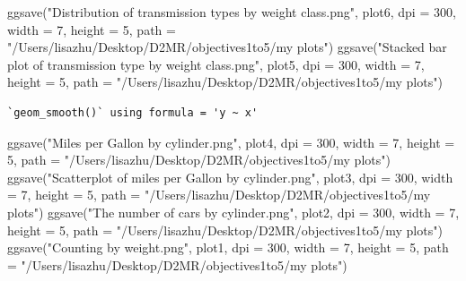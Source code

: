 \documentclass[
  man,
  floatsintext,
  longtable,
  nolmodern,
  notxfonts,
  notimes,
  colorlinks=true,linkcolor=blue,citecolor=blue,urlcolor=blue]{apa7}
\newenvironment{Shaded}{\begin{snugshade}}{\end{snugshade}}
\newcommand{\AttributeTok}[1]{\textcolor[rgb]{0.40,0.45,0.13}{#1}}
\newcommand{\DecValTok}[1]{\textcolor[rgb]{0.68,0.00,0.00}{#1}}
\newcommand{\FunctionTok}[1]{\textcolor[rgb]{0.28,0.35,0.67}{#1}}
\newcommand{\NormalTok}[1]{\textcolor[rgb]{0.00,0.23,0.31}{#1}}
\newcommand{\StringTok}[1]{\textcolor[rgb]{0.13,0.47,0.30}{#1}}
\begin{document}
\begin{Shaded}
\begin{Highlighting}[]
\FunctionTok{ggsave}\NormalTok{(}\StringTok{"Distribution of transmission types by weight class.png"}\NormalTok{, plot6, }\AttributeTok{dpi =} \DecValTok{300}\NormalTok{, }\AttributeTok{width =} \DecValTok{7}\NormalTok{, }\AttributeTok{height =} \DecValTok{5}\NormalTok{, }\AttributeTok{path =} \StringTok{"/Users/lisazhu/Desktop/D2MR/objectives1to5/my plots"}\NormalTok{)}
\FunctionTok{ggsave}\NormalTok{(}\StringTok{"Stacked bar plot of transmission type by weight class.png"}\NormalTok{, plot5, }\AttributeTok{dpi =} \DecValTok{300}\NormalTok{, }\AttributeTok{width =} \DecValTok{7}\NormalTok{, }\AttributeTok{height =} \DecValTok{5}\NormalTok{, }\AttributeTok{path =} \StringTok{"/Users/lisazhu/Desktop/D2MR/objectives1to5/my plots"}\NormalTok{)}
\end{Highlighting}
\end{Shaded}

\begin{verbatim}
`geom_smooth()` using formula = 'y ~ x'
\end{verbatim}

\begin{Shaded}
\begin{Highlighting}[]
\FunctionTok{ggsave}\NormalTok{(}\StringTok{"Miles per Gallon by cylinder.png"}\NormalTok{, plot4, }\AttributeTok{dpi =} \DecValTok{300}\NormalTok{, }\AttributeTok{width =} \DecValTok{7}\NormalTok{, }\AttributeTok{height =} \DecValTok{5}\NormalTok{, }\AttributeTok{path =} \StringTok{"/Users/lisazhu/Desktop/D2MR/objectives1to5/my plots"}\NormalTok{)}
\FunctionTok{ggsave}\NormalTok{(}\StringTok{"Scatterplot of miles per Gallon by cylinder.png"}\NormalTok{, plot3, }\AttributeTok{dpi =} \DecValTok{300}\NormalTok{, }\AttributeTok{width =} \DecValTok{7}\NormalTok{, }\AttributeTok{height =} \DecValTok{5}\NormalTok{, }\AttributeTok{path =} \StringTok{"/Users/lisazhu/Desktop/D2MR/objectives1to5/my plots"}\NormalTok{)}
\FunctionTok{ggsave}\NormalTok{(}\StringTok{"The number of cars by cylinder.png"}\NormalTok{, plot2, }\AttributeTok{dpi =} \DecValTok{300}\NormalTok{, }\AttributeTok{width =} \DecValTok{7}\NormalTok{, }\AttributeTok{height =} \DecValTok{5}\NormalTok{, }\AttributeTok{path =} \StringTok{"/Users/lisazhu/Desktop/D2MR/objectives1to5/my plots"}\NormalTok{)}
\FunctionTok{ggsave}\NormalTok{(}\StringTok{"Counting by weight.png"}\NormalTok{, plot1, }\AttributeTok{dpi =} \DecValTok{300}\NormalTok{, }\AttributeTok{width =} \DecValTok{7}\NormalTok{, }\AttributeTok{height =} \DecValTok{5}\NormalTok{, }\AttributeTok{path =} \StringTok{"/Users/lisazhu/Desktop/D2MR/objectives1to5/my plots"}\NormalTok{)}
\end{Highlighting}
\end{Shaded}
\end{document}
